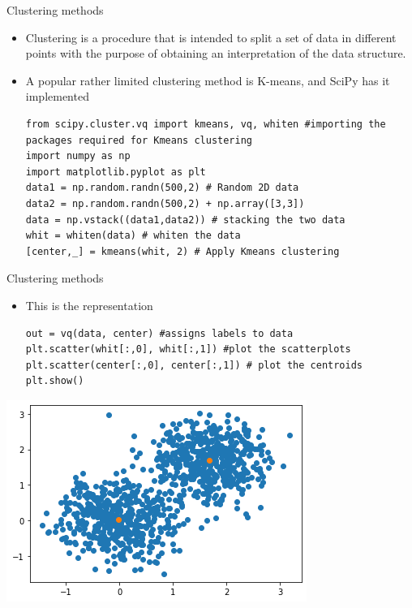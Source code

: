 \documentclass{beamer}
\begin{document}
\begin{frame}[fragile]{Clustering methods}
    \begin{itemize}
        \item Clustering is a procedure that is intended to split a set of data in different points with the purpose of obtaining an interpretation of the data structure. 
        \item A popular rather limited clustering method is K-means, and SciPy has it implemented 
\begin{lstlisting}
from scipy.cluster.vq import kmeans, vq, whiten #importing the packages required for Kmeans clustering
import numpy as np
import matplotlib.pyplot as plt
data1 = np.random.randn(500,2) # Random 2D data 
data2 = np.random.randn(500,2) + np.array([3,3]) 
data = np.vstack((data1,data2)) # stacking the two data 
whit = whiten(data) # whiten the data
[center,_] = kmeans(whit, 2) # Apply Kmeans clustering 
\end{lstlisting}
\end{itemize}
\end{frame}


\begin{frame}[fragile]{Clustering methods}
    \begin{itemize}
        \item This is the representation
\begin{lstlisting}
out = vq(data, center) #assigns labels to data 
plt.scatter(whit[:,0], whit[:,1]) #plot the scatterplots
plt.scatter(center[:,0], center[:,1]) # plot the centroids
plt.show()
\end{lstlisting}
\end{itemize}
\begin{center}
\includegraphics[scale=0.45]{Module 3 (Python tools)/pics/clusters.png}
\end{center}
\end{frame}
\end{document}
